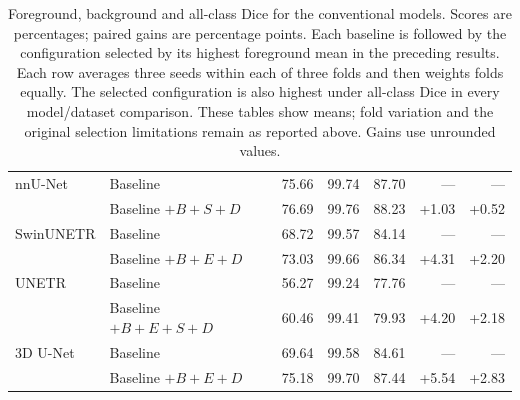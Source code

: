 \documentclass[12pt,a4paper]{article}
\begin{document}
\begin{table}[p]
\begin{tabular}{@{}llrrrrr@{}}
nnU-Net & Baseline & 75.66 & 99.74 & 87.70 & --- & --- \\
 & Baseline $+B+S+D$ & 76.69 & 99.76 & 88.23 & +1.03 & +0.52 \\
SwinUNETR & Baseline & 68.72 & 99.57 & 84.14 & --- & --- \\
 & Baseline $+B+E+D$ & 73.03 & 99.66 & 86.34 & +4.31 & +2.20 \\
UNETR & Baseline & 56.27 & 99.24 & 77.76 & --- & --- \\
 & Baseline $+B+E+S+D$ & 60.46 & 99.41 & 79.93 & +4.20 & +2.18 \\
3D U-Net & Baseline & 69.64 & 99.58 & 84.61 & --- & --- \\
 & Baseline $+B+E+D$ & 75.18 & 99.70 & 87.44 & +5.54 & +2.83 \\
\hline
\end{tabular}
\caption{Foreground, background and all-class Dice for the conventional
models. Scores are percentages; paired gains are percentage points.
Each baseline is followed by the configuration selected by its highest
foreground mean in the preceding results. Each row averages three seeds
within each of three folds and then weights folds equally. The selected
configuration is also highest under all-class Dice in every model/dataset
comparison. These tables show means; fold variation and the original
selection limitations remain as reported above. Gains use unrounded values.}
\label{tab:background-conventional}
\end{table}
\end{document}

